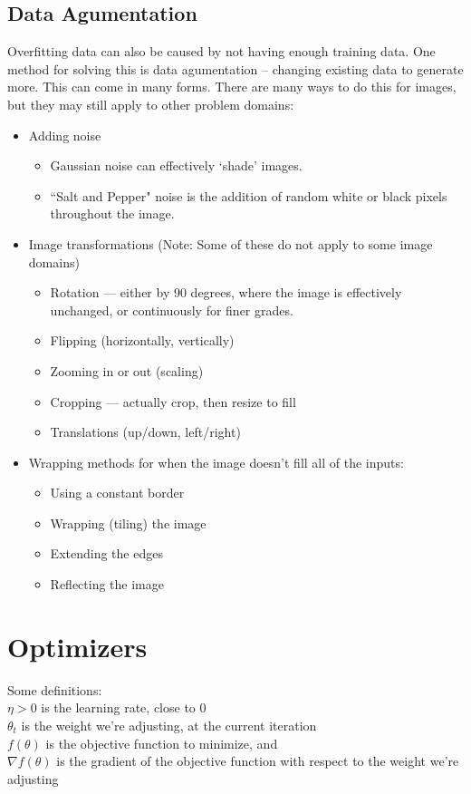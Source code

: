 \documentclass[fleqn]{article}
\begin{document}
\subsection{Data Agumentation}
Overfitting data can also be caused by not having enough training data.
One method for solving this is data agumentation -- changing existing data
to generate more. This can come in many forms. There are many ways to do
this for images, but they may still apply to other problem domains:
\begin{itemize}
	\item Adding noise
	\begin{itemize}
		\item Gaussian noise can effectively `shade' images.
		\item ``Salt and Pepper" noise is the addition of random white or
		black pixels throughout the image.
	\end{itemize}

	\item Image transformations (Note: Some of these do not apply to some
	image domains)
	\begin{itemize}
		\item Rotation --- either by 90 degrees, where the image is
		effectively unchanged, or continuously for finer grades.
		\item Flipping (horizontally, vertically)
		\item Zooming in or out (scaling)
		\item Cropping --- actually crop, then resize to fill
		\item Translations (up/down, left/right)
	\end{itemize}

	\item Wrapping methods for when the image doesn't fill all of the
	inputs:
	\begin{itemize}
		\item Using a constant border
		\item Wrapping (tiling) the image
		\item Extending the edges
		\item Reflecting the image
	\end{itemize}
\end{itemize}

\section{Optimizers}
Some definitions: \\
\hspace*{6mm} $\eta > 0$ is the learning rate, close to 0 \\
\hspace*{6mm} $\theta_t$ is the weight we're adjusting, at the current
	iteration \\
\hspace*{6mm} $f(\theta)$ is the objective function to minimize, and \\
\hspace*{6mm} $\nabla f(\theta)$ is the gradient of the objective function
	with respect to the weight we're adjusting
\end{document}
